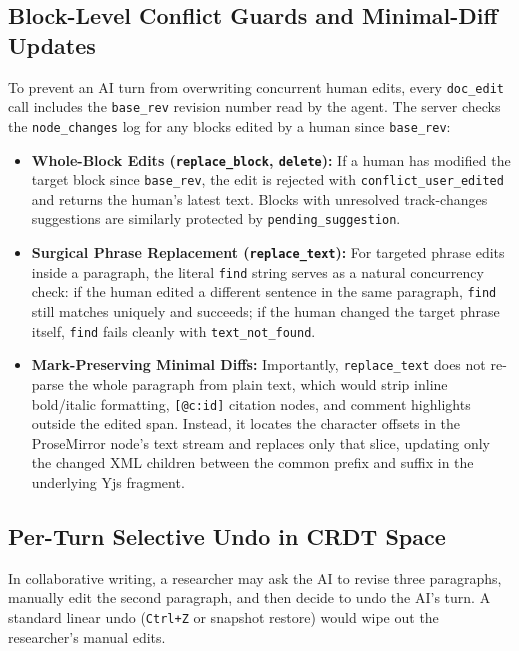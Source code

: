 \documentclass[11pt,a4paper]{article}
\begin{document}
\subsection{Block-Level Conflict Guards and Minimal-Diff Updates}
To prevent an AI turn from overwriting concurrent human edits, every \texttt{doc\_edit} call includes the \texttt{base\_rev} revision number read by the agent. The server checks the \texttt{node\_changes} log for any blocks edited by a human since \texttt{base\_rev}:
\begin{itemize}[leftmargin=1.5em,itemsep=2pt]
  \item \textbf{Whole-Block Edits (\texttt{replace\_block}, \texttt{delete}):} If a human has modified the target block since \texttt{base\_rev}, the edit is rejected with \texttt{conflict\_user\_edited} and returns the human's latest text. Blocks with unresolved track-changes suggestions are similarly protected by \texttt{pending\_suggestion}.
  \item \textbf{Surgical Phrase Replacement (\texttt{replace\_text}):} For targeted phrase edits inside a paragraph, the literal \texttt{find} string serves as a natural concurrency check: if the human edited a different sentence in the same paragraph, \texttt{find} still matches uniquely and succeeds; if the human changed the target phrase itself, \texttt{find} fails cleanly with \texttt{text\_not\_found}.
  \item \textbf{Mark-Preserving Minimal Diffs:} Importantly, \texttt{replace\_text} does not re-parse the whole paragraph from plain text, which would strip inline bold/italic formatting, \texttt{[@c:id]} citation nodes, and comment highlights outside the edited span. Instead, it locates the character offsets in the ProseMirror node's text stream and replaces only that slice, updating only the changed XML children between the common prefix and suffix in the underlying Yjs fragment.
\end{itemize}

\subsection{Per-Turn Selective Undo in CRDT Space}
In collaborative writing, a researcher may ask the AI to revise three paragraphs, manually edit the second paragraph, and then decide to undo the AI's turn. A standard linear undo (\texttt{Ctrl+Z} or snapshot restore) would wipe out the researcher's manual edits.
\end{document}
